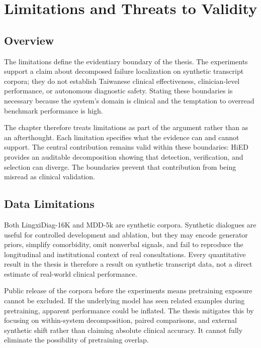 \chapter{Limitations and Threats to Validity}
\label{ch:limitations}

\section{Overview}

The limitations define the evidentiary boundary of the thesis. The experiments support a claim about decomposed failure localization on synthetic transcript corpora; they do not establish Taiwanese clinical effectiveness, clinician-level performance, or autonomous diagnostic safety. Stating these boundaries is necessary because the system's domain is clinical and the temptation to overread benchmark performance is high.

The chapter therefore treats limitations as part of the argument rather than as an afterthought. Each limitation specifies what the evidence can and cannot support. The central contribution remains valid within these boundaries: HiED provides an auditable decomposition showing that detection, verification, and selection can diverge. The boundaries prevent that contribution from being misread as clinical validation.

\section{Data Limitations}

Both LingxiDiag-16K and MDD-5k are synthetic corpora. Synthetic dialogues are useful for controlled development and ablation, but they may encode generator priors, simplify comorbidity, omit nonverbal signals, and fail to reproduce the longitudinal and institutional context of real consultations. Every quantitative result in the thesis is therefore a result on synthetic transcript data, not a direct estimate of real-world clinical performance.

Public release of the corpora before the experiments means pretraining exposure cannot be excluded. If the underlying model has seen related examples during pretraining, apparent performance could be inflated. The thesis mitigates this by focusing on within-system decomposition, paired comparisons, and external synthetic shift rather than claiming absolute clinical accuracy. It cannot fully eliminate the possibility of pretraining overlap.

